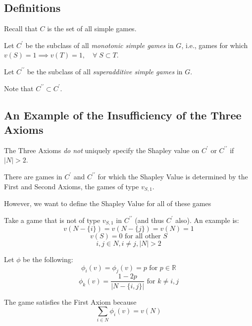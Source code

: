\documentclass[
paper=128mm:96mm, %
fontsize=11pt, %
pagesize, %
parskip=half-, %
]{scrartcl} %
\theoremstyle{mythmstyle} %
\begin{document}
\clearpage

\subsection{Definitions}

Recall that $C$ is the set of all simple games.

Let $C^{\prime}$ be the subclass of all \emph{monotonic simple games} in $G$, i.e., games for which $v(S) = 1 \implies v(T) = 1, \quad \forall \; S \subset T$.

Let $C^{\prime\prime}$ be the subclass of all \emph{superadditive simple games} in $G$.

Note that $C^{\prime\prime} \subset C^{\prime}$.

\clearpage

\subsection{An Example of the Insufficiency of the Three Axioms}

The Three Axioms \emph{do not} uniquely specify the Shapley value on $C^{\prime}$ or $C^{\prime\prime}$ if $|N| > 2$.

There are games in $C^{\prime}$ and $C^{\prime\prime}$ for which the Shapley Value is determined by the First and Second Axioms, the games of type $v_{S,1}$.

However, we want to define the Shapley Value for all of these games

\clearpage

Take a game that is not of type $v_{S,1}$ in $C^{\prime\prime}$ (and thus $C^{\prime}$ also). An example is:
	\[ v(N - \{i\}) = v(N - \{j\}) = v(N) = 1 \]
    \[ v(S) = 0 \text{ for all other } S \]
    \[ i, j \in N, i \neq j, |N| > 2 \]

Let $\phi$ be the following:
	\[ \phi_{i}(v) = \phi_{j}(v) = p \text{ for } p \in \mathbb{R} \]
    \[ \phi_{k}(v) = \frac{1 - 2p}{|N - \{i, j\}|} \text{ for } k \neq i, j \]

\clearpage

The game satisfies the First Axiom because 
	\[ \sum_{i \in N}{\phi_{i}(v)} = v(N) \]
\end{document}
